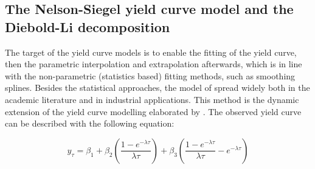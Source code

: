 \documentclass[12pt,bibliography=totoc]{article}
\begin{document}
\subsection{The Nelson-Siegel yield curve model and the Diebold-Li decomposition}


The target of the yield curve models is to enable the fitting of the yield curve, then the parametric interpolation and extrapolation afterwards, which is in line with the non-parametric (statistics based) fitting methods, such as smoothing splines.
Besides the statistical approaches, the model of \cite{diebold2006forecasting} spread widely both in the academic literature and in industrial applications. This method is the dynamic extension of the yield curve modelling elaborated by \cite{nelson1987parsimonious}. The observed yield curve can be described with the following equation:

\begin{equation}
y_{\tau}=\beta_{1}+\beta_{2}\left ( \frac{1-e^{-\lambda\tau}}{\lambda\tau} \right )+\beta_{3}\left ( \frac{1-e^{-\lambda\tau}}{\lambda\tau} -e^{-\lambda\tau}\right )
\end{equation}

\end{document}

